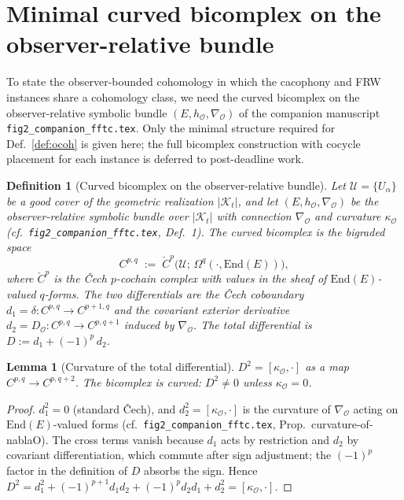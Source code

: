 \documentclass[11pt]{article}
\newtheorem{definition}{Definition}
\newtheorem{lemma}{Lemma}
\newcommand{\Obs}{\mathcal{O}}
\newcommand{\kappaO}{\kappa_{\Obs}}
\newcommand{\nablaO}{\nabla_{\Obs}}
\newcommand{\hO}{h_{\Obs}}
\newcommand{\DO}{D_{\Obs}}
\newcommand{\EE}{E}
\newcommand{\Kt}{\mathcal{K}_t}
\newcommand{\End}{\mathrm{End}}
\begin{document}
\section{Minimal curved bicomplex on the observer-relative bundle}
\label{sec:bicomplex}

To state the observer-bounded cohomology in which the cacophony
and FRW instances share a cohomology class, we need the
curved bicomplex on the observer-relative symbolic bundle
$(\EE, \hO, \nablaO)$ of the companion manuscript
\texttt{fig2\_companion\_fftc.tex}. Only the minimal structure
required for Def.~\ref{def:ocoh} is given here; the full
bicomplex construction with cocycle placement for each instance
is deferred to post-deadline work.

\begin{definition}[Curved bicomplex on the observer-relative bundle]
\label{def:bicomplex}
Let $\mathcal{U} = \{U_\alpha\}$ be a good cover of the geometric
realization $|\Kt|$, and let $(\EE, \hO, \nablaO)$ be the
observer-relative symbolic bundle over $|\Kt|$ with connection
$\nablaO$ and curvature $\kappaO$ (cf.\ \texttt{fig2\_companion\_fftc.tex},
Def.~1). The \emph{curved bicomplex} is the bigraded space
\[
C^{p, q} \;:=\; \check{C}^p\bigl(\mathcal{U};\, \Omega^q(\cdot, \End(\EE))\bigr),
\]
where $\check{C}^p$ is the \v{C}ech $p$-cochain complex with
values in the sheaf of $\End(\EE)$-valued $q$-forms. The two
differentials are the \v{C}ech coboundary
$d_1 = \delta: C^{p,q} \to C^{p+1, q}$ and the covariant
exterior derivative $d_2 = \DO: C^{p,q} \to C^{p, q+1}$ induced
by $\nablaO$. The total differential is
$D := d_1 + (-1)^p\, d_2$.
\end{definition}

\begin{lemma}[Curvature of the total differential]
\label{lem:curvature}
$D^2 = [\kappaO, \cdot]$ as a map $C^{p,q} \to C^{p, q+2}$. The
bicomplex is \emph{curved}: $D^2 \neq 0$ unless $\kappaO = 0$.
\end{lemma}

\begin{proof}
$d_1^2 = 0$ (standard \v{C}ech), and
$d_2^2 = [\kappaO, \cdot]$ is the curvature of $\nablaO$
acting on $\End(\EE)$-valued forms
(cf.\ \texttt{fig2\_companion\_fftc.tex},
Prop.~curvature-of-nablaO). The cross terms vanish
because $d_1$ acts by restriction and $d_2$ by covariant
differentiation, which commute after sign adjustment; the $(-1)^p$
factor in the definition of $D$ absorbs the sign. Hence
$D^2 = d_1^2 + (-1)^{p+1} d_1 d_2 + (-1)^p d_2 d_1 + d_2^2 =
[\kappaO, \cdot]$.
\end{proof}
\end{document}
